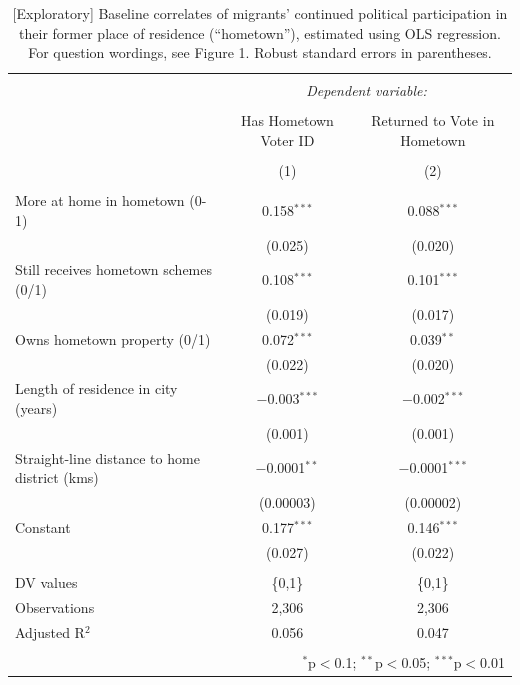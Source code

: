 \documentclass[
  11.5pt,
]{article}
\begin{document}
\begin{table}[!htbp] \centering 
  \caption{[Exploratory] Baseline correlates of migrants' continued political participation in their former place of residence (``hometown''), estimated using OLS regression. For question wordings, see Figure 1. Robust standard errors in parentheses.} 
  \label{} 
\small 
\begin{tabular}{@{\extracolsep{5pt}}lcc} 
\\[-1.8ex]\hline 
\hline \\[-1.8ex] 
 & \multicolumn{2}{c}{\textit{Dependent variable:}} \\ 
\cline{2-3} 
\\[-1.8ex] & Has Hometown Voter ID & Returned to Vote in Hometown \\ 
\\[-1.8ex] & (1) & (2)\\ 
\hline \\[-1.8ex] 
 More at home in hometown (0-1) & 0.158$^{***}$ & 0.088$^{***}$ \\ 
  & (0.025) & (0.020) \\ 
  Still receives hometown schemes (0/1) & 0.108$^{***}$ & 0.101$^{***}$ \\ 
  & (0.019) & (0.017) \\ 
  Owns hometown property (0/1) & 0.072$^{***}$ & 0.039$^{**}$ \\ 
  & (0.022) & (0.020) \\ 
  Length of residence in city (years) & $-$0.003$^{***}$ & $-$0.002$^{***}$ \\ 
  & (0.001) & (0.001) \\ 
  Straight-line distance to home district (kms) & $-$0.0001$^{**}$ & $-$0.0001$^{***}$ \\ 
  & (0.00003) & (0.00002) \\ 
  Constant & 0.177$^{***}$ & 0.146$^{***}$ \\ 
  & (0.027) & (0.022) \\ 
 \hline \\[-1.8ex] 
DV values & \{0,1\} & \{0,1\} \\ 
Observations & 2,306 & 2,306 \\ 
Adjusted R$^{2}$ & 0.056 & 0.047 \\ 
\hline 
\hline \\[-1.8ex] 
\multicolumn{3}{r}{$^{*}$p$<$0.1; $^{**}$p$<$0.05; $^{***}$p$<$0.01} \\ 
\end{tabular} 
\end{table}
\end{document}
